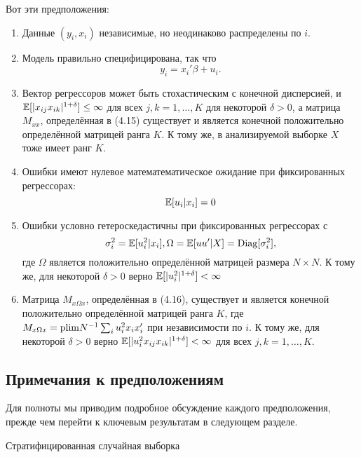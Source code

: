 Вот эти предположения:
\begin{small}
\begin{enumerate}
\item Данные $(y_i, x_i)$ независимые, но неодинаково распределены по $i$.
\item Модель правильно специфицирована, так что
$$y_i = x_i' \beta + u_i .$$
\item Вектор регрессоров может быть стохастическим с конечной дисперсией, и $\mathbb{E}[|x_{ij}x_{ik}|^{1+\delta}]\leq \infty$ для всех $j, k = 1, \ldots , K$ для некоторой $\delta >0$, а матрица $M_{xx}$, определённая в (4.15) существует и является конечной положительно определённой матрицей ранга $K$. К тому же, в анализируемой выборке $X$ тоже имеет ранг $K$. 
\item Ошибки имеют нулевое математематическое ожидание при фиксированных регрессорах:
$$\mathbb{E} [u_i | x_i] = 0$$
\item Ошибки условно гетероскедастичны при фиксированных регрессорах с
\begin{equation}
\sigma_i^2 = \mathbb{E}[u_i^2 | x_i], \\
\Omega = \mathbb{E} [uu'|X] = \mathrm{Diag} [\sigma_i^2],
\end{equation}
где $\Omega$ является положительно определённой матрицей размера $N \times N$. К тому же, для некоторой $\delta>0$ верно $\mathbb{E} [|u_i^2|^{1+\delta}]< \infty$
\item Матрица $M_{x \Omega x}$, определённая в (4.16), существует и является конечной положительно определённой матрицей ранга $K$, где $M_{x \Omega x} = \mathrm{plim } N^{-1} \sum_{i} u_i^2 x_i x_i'$ при независимости по $i$. К тому же, для некоторой $\delta>0$ верно $\mathbb{E} [|u_i^2 x_{ij} x_{ik}|^{1+\delta}]< \infty$ для всех $j, k = 1, \ldots , K$. 
\end{enumerate}
\end{small}

\subsection{Примечания к предположениям}
Для полноты мы приводим подробное обсуждение каждого предположения, прежде чем перейти к ключевым результатам в следующем разделе.

\begin{center}
Стратифицированная случайная выборка
\end{center}

